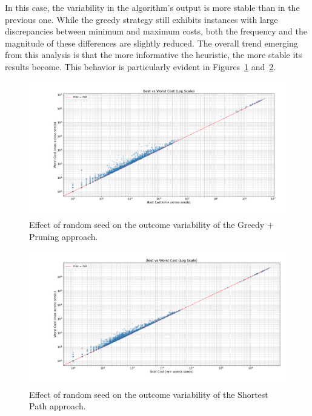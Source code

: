 In this case, the variability in the algorithm's output is more stable than in the previous one. While the greedy strategy still
exhibits instances with large discrepancies between minimum and maximum costs, both the frequency and the magnitude of these
differences are slightly reduced.
The overall trend emerging from this analysis is that the more informative the heuristic, the more stable its results become.
This behavior is particularly evident in Figures~\ref{fig:rand_pruning} and~\ref{fig:rand_sp}.

\begin{figure}[ht]
	\centering
	\includegraphics[width=\textwidth]{images/randomization_pruning.png}
	\caption{Effect of random seed on the outcome variability of the Greedy + Pruning approach.}
	\label{fig:rand_pruning}
\end{figure}

\begin{figure}[ht]
	\centering
	\includegraphics[width=\textwidth]{images/randomization_sp.png}
	\caption{Effect of random seed on the outcome variability of the Shortest Path approach.}
	\label{fig:rand_sp}
\end{figure}

